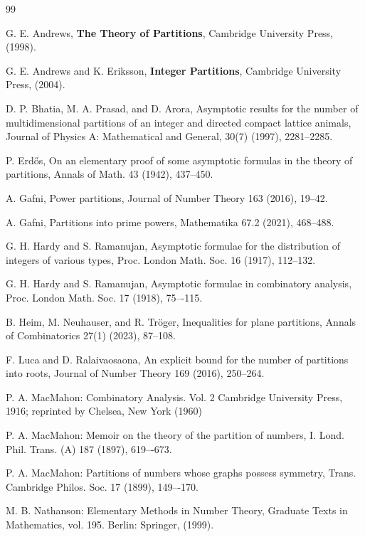 \documentclass[11pt]{article}
\theoremstyle{plain}
\begin{document}
\begin{thebibliography}{99}

G. E. Andrews, \textbf{The Theory of Partitions}, Cambridge University Press, (1998).

G. E. Andrews and K. Eriksson, \textbf{Integer Partitions}, Cambridge University Press, (2004).


D. P. Bhatia, M. A. Prasad, and D. Arora, Asymptotic results for the number of multidimensional partitions of an integer and directed compact lattice animals, Journal of Physics A: Mathematical and General, 30(7) (1997), 2281--2285.


P. Erd\H{o}s,
On an elementary proof of some asymptotic formulas in the
theory of partitions, Annals of Math. 43 (1942), 437--450.



A. Gafni, Power partitions, Journal of Number Theory 163 (2016), 19--42.

A. Gafni, Partitions into prime powers, Mathematika 67.2 (2021), 468--488.



G. H. Hardy and S. Ramanujan, Asymptotic formulae for the distribution of integers of various types, Proc. London Math. Soc. 16 (1917), 112--132.

G. H. Hardy and S. Ramanujan, Asymptotic formulae in combinatory analysis, Proc. London Math. Soc. 17 (1918), 75–-115.


B. Heim, M. Neuhauser, and R. Tröger, Inequalities for plane partitions, Annals of Combinatorics 27(1) (2023), 87--108.

F. Luca and D. Ralaivaosaona, An explicit bound for the number of partitions into roots, Journal of Number Theory 169 (2016), 250--264.


P. A. MacMahon: Combinatory Analysis. Vol. 2 Cambridge University Press, 1916; reprinted by Chelsea, New York (1960)

P. A. MacMahon: Memoir on the theory of the partition of numbers, I. Lond.
Phil. Trans. (A) 187 (1897), 619–-673.

P. A. MacMahon: Partitions of numbers whose graphs possess symmetry, Trans.
Cambridge Philos. Soc. 17 (1899), 149–-170.

M. B. Nathanson: Elementary Methods in Number Theory, Graduate Texts in Mathematics, vol. 195. Berlin: Springer, (1999).


\end{thebibliography}
\end{document}
